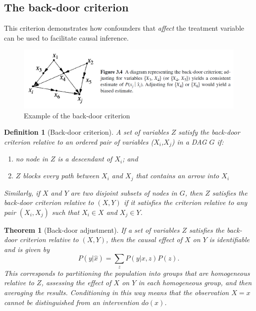 \documentclass[11pt]{article}
\numberwithin{equation}{section}
\newtheorem{thm}{Theorem}[section]
\newtheorem{defn}{Definition}[section]
\begin{document}
\subsection{The back-door criterion}
This criterion demonstrates how confounders that \textit{affect} the treatment variable can be used to facilitate causal inference.

\begin{figure}
\begin{center}
\includegraphics[width=0.8\columnwidth]{figures/back-door.png}  
\end{center}
\caption{Example of the back-door criterion
}
\label{Fig:front_door}
\end{figure}

\begin{defn}[Back-door criterion] A set of variables $Z$ satisfy the back-door criterion relative to an ordered pair of variables ($X_i$,$X_j$) in a DAG $G$ if:
\begin{enumerate}[noitemsep]
\item no node in $Z$ is a descendant of $X_i$; and
\item $Z$ blocks every path between $X_i$ and $X_j$ that contains an arrow into $X_i$
\end{enumerate}
Similarly, if $X$ and $Y$ are two disjoint subsets of nodes in $G$, then $Z$ satisfies the back-door criterion relative to $(X,Y)$ if it satisfies the criterion relative to any pair $(X_i, X_j)$ such that $X_i \in X$ and $X_j \in Y$.
\end{defn}

\begin{thm}[Back-door adjustment]
If a set of variables $Z$ satisfies the back-door criterion relative to $(X,Y)$, then the causal effect of $X$ on $Y$ is identifiable and is given by
\begin{equation}
P(y|\hat{x}) = \sum_z P(y|x,z)P(z).
\end{equation}
This corresponds to partitioning the population into groups that are homogeneous relative to $Z$, assessing the effect of $X$ on $Y$ in each homogeneous group, and then averaging the results. Conditioning in this way means that the observation $X=x$ cannot be distinguished from an intervention $do(x)$. \label{thm:back-door-adjustment}
\end{thm}
\end{document}
